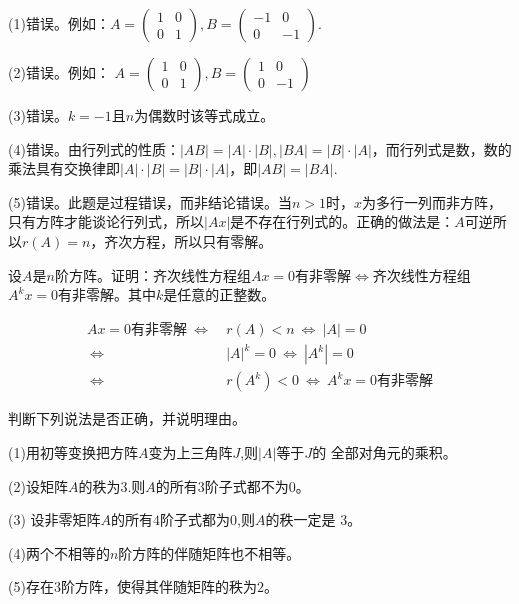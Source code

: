 \documentclass[a4paper]{report}
\begin{document}
\begin{jie}
(1)错误。例如：$A=
\begin{pmatrix}
1&0\\
0&1
\end{pmatrix}
,B=
\begin{pmatrix}
-1&0\\
0&-1
\end{pmatrix}$.

(2)错误。例如：
$
A=\begin{pmatrix}
1&0\\
0&1
\end{pmatrix},B=\begin{pmatrix}
1&0\\
0&-1
\end{pmatrix}
$

(3)错误。$k=-1$且$n$为偶数时该等式成立。

(4)错误。由行列式的性质：$|AB|=|A|\cdot|B|,|BA|=|B|\cdot |A|$，而行列式是数，数的乘法具有交换律即$|A|\cdot|B|=|B|\cdot |A|$，即$|AB|=|BA|$.

(5)错误。此题是过程错误，而非结论错误。当$n>1$时，$x$为多行一列而非方阵，只有方阵才能谈论行列式，所以$|Ax|$是不存在行列式的。正确的做法是：$A$可逆所以$r(A)=n$，齐次方程，所以只有零解。
\end{jie}

\EX 设$A$是$n$阶方阵。证明：齐次线性方程组$Ax=0$有非零解$\Leftrightarrow$齐次线性方程组$A^kx=0$有非零解。其中$k$是任意的正整数。

\begin{zhengming}
\begin{align*}
Ax=0\text{有非零解}~\Leftrightarrow~&r(A)<n~\Leftrightarrow~|A|=0\\
~\Leftrightarrow~&|A|^k=0~\Leftrightarrow~|A^k|=0\\
~\Leftrightarrow~&r(A^k)<0~\Leftrightarrow~A^{k}x=0\text{有非零解}
\end{align*}
\end{zhengming}

\EX 判断下列说法是否正确，并说明理由。

(1)用初等变换把方阵$A$变为上三角阵$J$,则$|A|$等于$J$的
全部对角元的乘积。

(2)设矩阵$A$的秩为$3$.则$A$的所有$3$阶子式都不为$0$。

(3) 设非零矩阵$A$的所有$4$阶子式都为$0$,则$A$的秩一定是
$3$。

(4)两个不相等的$n$阶方阵的伴随矩阵也不相等。

(5)存在$3$阶方阵，使得其伴随矩阵的秩为$2$。
\end{document}
